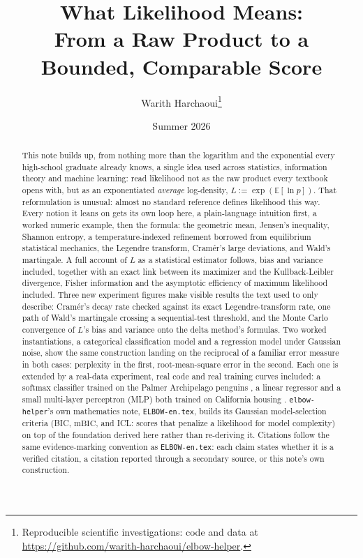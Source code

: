 \documentclass[11pt]{article}
\title{What Likelihood Means: \\ From a Raw Product to a Bounded, Comparable Score}
\author{Warith Harchaoui\thanks{Reproducible scientific investigations: code and data at
  \url{https://github.com/warith-harchaoui/elbow-helper}.}}
\date{Summer 2026}
\newcommand{\code}[1]{\texttt{#1}}
\begin{document}
\maketitle

\begin{abstract}
This note builds up, from nothing more than the logarithm and the
exponential every high-school graduate already knows, a single idea
used across statistics, information theory and machine learning: read
likelihood not as the raw product every textbook opens with, but as an
exponentiated \emph{average} log-density, $L := \exp(\mathbb E[\ln
p])$. That reformulation is unusual: almost no standard reference
defines likelihood this way. Every notion it leans on gets its own
loop here, a plain-language intuition first, a worked numeric example,
then the formula: the geometric mean, Jensen's inequality, Shannon
entropy, a temperature-indexed refinement borrowed from equilibrium
statistical mechanics, the Legendre transform, Cram\'er's large
deviations, and Wald's martingale. A full account of $L$ as a
statistical estimator follows, bias and variance included, together
with an exact link between its maximizer and the Kullback-Leibler
divergence, Fisher information and the asymptotic efficiency of
maximum likelihood included. Three new experiment figures make
visible results the text used to only describe: Cram\'er's decay
rate checked against its exact
Legendre-transform rate, one path of Wald's martingale crossing a
sequential-test threshold, and the Monte Carlo convergence of $L$'s
bias and variance onto the delta method's formulas. Two worked
instantiations, a categorical classification model and a regression
model under Gaussian noise, show the same construction landing on the
reciprocal of a familiar error measure in both cases: perplexity in
the first, root-mean-square error in the second. Each one is extended
by a real-data experiment, real code and real training curves
included: a softmax classifier trained on the Palmer Archipelago
penguins \citep{gorman2014}, a linear regressor and a small
multi-layer perceptron (MLP) both trained on California housing
\citep{pace1997}. \code{elbow-helper}'s own mathematics note,
\code{ELBOW-en.tex}, builds
its Gaussian model-selection criteria (BIC, $\mathrm{mBIC}$, and ICL:
scores that penalize a likelihood for model complexity) on top
of the foundation derived here rather than re-deriving it. Citations
follow the same evidence-marking convention as \code{ELBOW-en.tex}: each
claim states whether it is a verified citation, a citation reported
through a secondary source, or this note's own construction.
\end{abstract}
\end{document}
